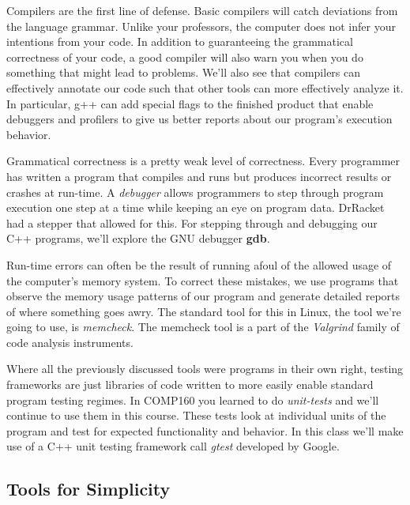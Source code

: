 \documentclass[]{tufte-handout}
\begin{document}
Compilers are the first line of defense.  Basic compilers will catch deviations from the language grammar.  Unlike your professors, the computer does not infer your intentions from your code.  In addition to guaranteeing the grammatical correctness of your code, a good compiler will also warn you when you do something that might lead to problems.  We'll also see that compilers can effectively annotate our code such that other tools can more effectively analyze it. In particular, g++ can add special flags to the finished product that enable debuggers and profilers to give us better reports about our program's execution behavior.

Grammatical correctness is a pretty weak level of correctness. Every programmer has written a program that compiles and runs but produces incorrect results or crashes at run-time. A \textit{debugger} allows programmers to step through program execution one step at a time while keeping an eye on program data. DrRacket had a stepper that allowed for this. For stepping through and debugging our C++ programs, we'll explore the GNU debugger \textbf{gdb}.

Run-time errors can often be the result of running afoul of the allowed usage of the computer's memory system.  To correct these mistakes, we use programs that observe the memory usage patterns of our program and generate detailed reports of where something goes awry. The standard tool for this in Linux, the tool we're going to use, is \textit{memcheck}. The memcheck tool is a part of the \textit{Valgrind} family of code analysis instruments.

Where all the previously discussed tools were programs in their own right, testing frameworks are just libraries of code written to more easily enable standard program testing regimes.  In COMP160 you learned to do \textit{unit-tests} and we'll continue to use them in this course. These tests look at individual units of the program and test for expected functionality and behavior.  In this class we'll make use of a C++ unit testing framework call \textit{gtest} developed by Google.  

\subsection{Tools for Simplicity}
\end{document}

